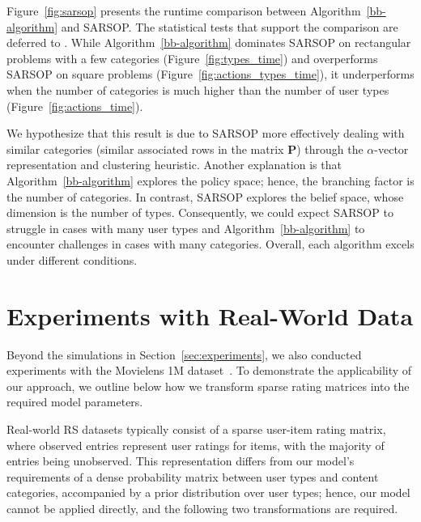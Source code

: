 Figure~\ref{fig:sarsop} presents the runtime comparison between Algorithm~\ref{bb-algorithm} and SARSOP. The statistical tests that support the comparison are deferred to . While Algorithm~\ref{bb-algorithm} dominates SARSOP on rectangular problems with a few categories (Figure~\ref{fig:types_time}) and overperforms SARSOP on square problems (Figure~\ref{fig:actions_types_time}), it underperforms when the number of categories is much higher than the number of user types (Figure~\ref{fig:actions_time}). 

We hypothesize that this result is due to SARSOP more effectively dealing with similar categories (similar associated rows in the matrix $\bm P$) through the $\alpha$-vector representation and clustering heuristic. Another explanation is that Algorithm~\ref{bb-algorithm} explores the policy space; hence, the branching factor is the number of categories. In contrast, SARSOP explores the belief space, whose dimension is the number of types. Consequently, we could expect SARSOP to struggle in cases with many user types and Algorithm~\ref{bb-algorithm} to encounter challenges in cases with many categories. Overall, each algorithm excels under different conditions.

\section{Experiments with Real-World Data} 
Beyond the simulations in Section~\ref{sec:experiments}, we also conducted experiments with the Movielens 1M dataset~\cite{harper2015movielens}. To demonstrate the applicability of our approach, we outline below how we transform sparse rating matrices into the required model parameters.

Real-world RS datasets typically consist of a sparse user-item rating matrix, where observed entries represent user ratings for items, with the majority of entries being unobserved. This representation differs from our model's requirements of a dense probability matrix between user types and content categories, accompanied by a prior distribution over user types; hence, our model cannot be applied directly, and the following two transformations are required.

